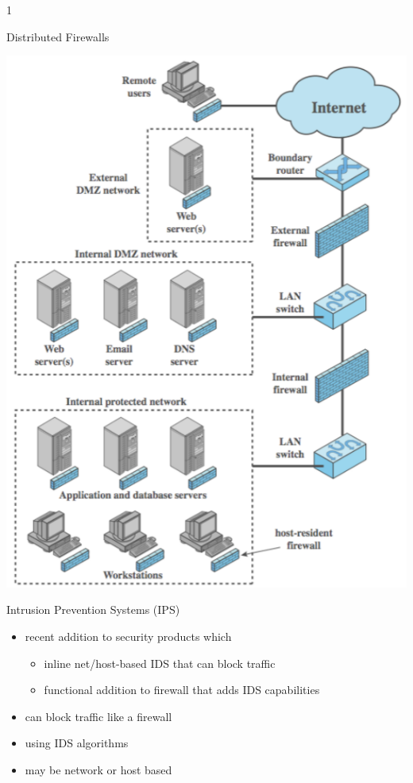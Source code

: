 1\documentclass{beamer}
\begin{document}
\begin{frame}{Distributed Firewalls}
  \begin{center}
    \includegraphics[width=0.5\linewidth]{distributed-firewalls}
  \end{center}
\end{frame}

\begin{frame}{Intrusion Prevention Systems (IPS)}
  \begin{itemize}
  \item recent addition to security products which 
    \begin{itemize}
    \item inline net/host-based IDS that can block traffic 
    \item functional addition to firewall that adds IDS 
      capabilities 
    \end{itemize}
  \item can block traffic like a firewall 
  \item using IDS algorithms 
  \item may be network or host based
  \end{itemize}
\end{frame}
\end{document}

